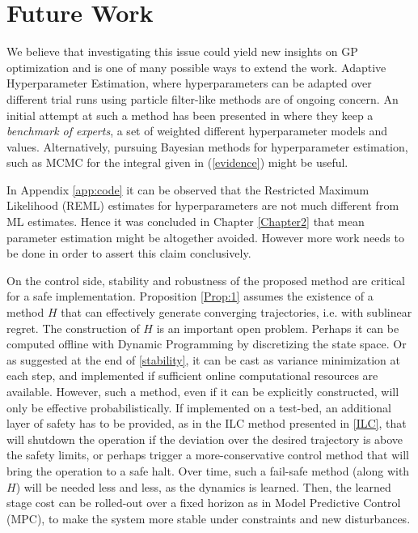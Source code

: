 \section{Future Work}
\label{ss:FutureWork}

We believe that investigating this issue could yield new insights on GP optimization and is one of many possible ways to extend the work. Adaptive Hyperparameter Estimation, where hyperparameters can be adapted over different trial runs using particle filter-like methods are of ongoing concern. An initial attempt at such a method has been presented in \cite{Ginsbourger} where they keep a \emph{benchmark of experts}, a set of weighted different hyperparameter models and values. Alternatively, pursuing Bayesian methods for hyperparameter estimation, such as MCMC for the integral given in (\ref{evidence}) might be useful.

In Appendix \ref{app:code} it can be observed that the Restricted Maximum Likelihood (REML) estimates for hyperparameters are not much different from ML estimates. Hence it was concluded in Chapter \ref{Chapter2} that mean parameter estimation might be altogether avoided. However more work needs to be done in order to assert this claim conclusively. 

On the control side, stability and robustness of the proposed method are critical for a safe implementation. Proposition \ref{Prop:1} assumes the existence of a method $H$ that can effectively generate converging trajectories, i.e. with sublinear regret. The construction of $H$ is an important open problem. Perhaps it can be computed offline with Dynamic Programming by discretizing the state space. Or as suggested at the end of \ref{stability}, it can be cast as variance minimization at each step, and implemented if sufficient online computational resources are available. However, such a method, even if it can be explicitly constructed, will only be effective probabilistically. If implemented on a test-bed, an additional layer of safety has to be provided, as in the ILC method presented in \ref{ILC}, that will shutdown the operation if the deviation over the desired trajectory is above the safety limits, or perhaps trigger a more-conservative control method that will bring the operation to a safe halt. Over time, such a fail-safe method (along with $H$) will be needed less and less, as the dynamics is learned. Then, the learned stage cost can be rolled-out over a fixed horizon as in Model Predictive Control (MPC), to make the system more stable under constraints and new disturbances.

